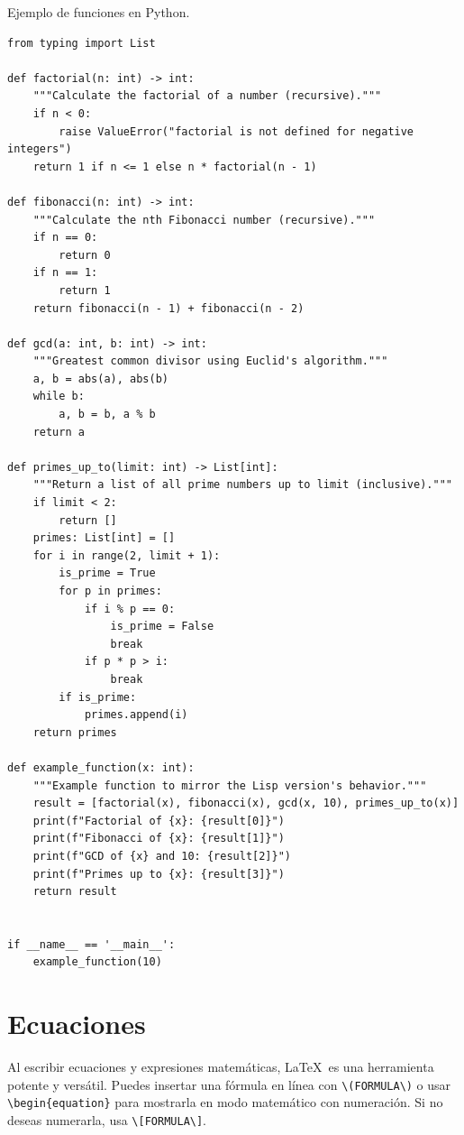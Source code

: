 \begin{longlisting}
\caption{Ejemplo de funciones en Python.}
\label{listing:python-code}
\begin{verbatim}
from typing import List

def factorial(n: int) -> int:
    """Calculate the factorial of a number (recursive)."""
    if n < 0:
        raise ValueError("factorial is not defined for negative integers")
    return 1 if n <= 1 else n * factorial(n - 1)

def fibonacci(n: int) -> int:
    """Calculate the nth Fibonacci number (recursive)."""
    if n == 0:
        return 0
    if n == 1:
        return 1
    return fibonacci(n - 1) + fibonacci(n - 2)

def gcd(a: int, b: int) -> int:
    """Greatest common divisor using Euclid's algorithm."""
    a, b = abs(a), abs(b)
    while b:
        a, b = b, a % b
    return a

def primes_up_to(limit: int) -> List[int]:
    """Return a list of all prime numbers up to limit (inclusive)."""
    if limit < 2:
        return []
    primes: List[int] = []
    for i in range(2, limit + 1):
        is_prime = True
        for p in primes:
            if i % p == 0:
                is_prime = False
                break
            if p * p > i:
                break
        if is_prime:
            primes.append(i)
    return primes

def example_function(x: int):
    """Example function to mirror the Lisp version's behavior."""
    result = [factorial(x), fibonacci(x), gcd(x, 10), primes_up_to(x)]
    print(f"Factorial of {x}: {result[0]}")
    print(f"Fibonacci of {x}: {result[1]}")
    print(f"GCD of {x} and 10: {result[2]}")
    print(f"Primes up to {x}: {result[3]}")
    return result


if __name__ == '__main__':
    example_function(10)
\end{verbatim}
\end{longlisting}

\section{Ecuaciones}

Al escribir ecuaciones y expresiones matemáticas, \LaTeX~es una herramienta potente y versátil. Puedes insertar una fórmula en línea con \verb|\(FORMULA\)| o usar \verb|\begin{equation}| para mostrarla en modo matemático con numeración. Si no deseas numerarla, usa \verb|\[FORMULA\]|.

